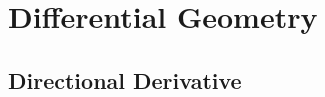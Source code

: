 
\section{Differential Geometry}\label{sec:dg}
\localtableofcontents

\subsection{Directional Derivative}

